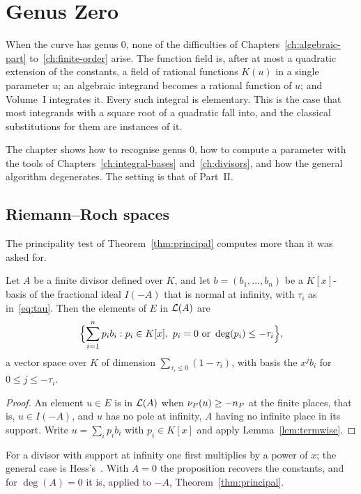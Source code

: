 \chapter{Genus Zero}\label{ch:genus-zero}

When the curve has genus $0$, none of the difficulties of
Chapters~\ref{ch:algebraic-part} to~\ref{ch:finite-order} arise. The function
field is, after at most a quadratic extension of the constants, a field of
rational functions $K(u)$ in a single parameter $u$; an algebraic integrand
becomes a rational function of $u$; and Volume~I integrates it. Every such
integral is elementary. This is the case that most integrands with a square
root of a quadratic fall into, and the classical substitutions for them are
instances of it.

The chapter shows how to recognise genus $0$, how to compute a parameter
with the tools of Chapters~\ref{ch:integral-bases} and~\ref{ch:divisors},
and how the general algorithm degenerates. The setting is that of Part~II.

\section{Riemann--Roch spaces}\label{sec:g0-rr}

The principality test of Theorem~\ref{thm:principal} computes more than it
was asked for.

\begin{proposition}\label{prop:rr-space}
Let $A$ be a finite divisor defined over $K$, and let $b = (b_1, \dots,
b_n)$ be a $K[x]$-basis of the fractional ideal $I(-A)$ that is normal at
infinity, with $\tau_i$ as in~\eqref{eq:tau}. Then the elements of $E$ in
$\mathcal{L}(A)$ are
\[
  \Bigl\{ \sum_{i=1}^n p_i b_i : p_i \in K[x],\ p_i = 0 \text{ or } \deg(p_i) \le -\tau_i \Bigr\} ,
\]
a vector space over $K$ of dimension $\sum_{\tau_i \le 0} (1 - \tau_i)$, with
basis the $x^j b_i$ for $0 \le j \le -\tau_i$.
\end{proposition}

\begin{proof}
An element $u \in E$ is in $\mathcal{L}(A)$ when $\nu_{P}(u) \ge -n_P$ at the finite
places, that is, $u \in I(-A)$, and $u$ has no pole at infinity, $A$ having no
infinite place in its support. Write $u = \sum_i p_i b_i$ with $p_i \in K[x]$
and apply Lemma~\ref{lem:termwise}.
\end{proof}

For a divisor with support at infinity one first multiplies by a power of
$x$; the general case is Hess's~\cite{hess2002}. With $A = 0$ the proposition
recovers the constants, and for $\deg(A) = 0$ it is, applied to $-A$,
Theorem~\ref{thm:principal}.

